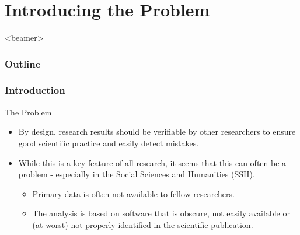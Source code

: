 %
%


\begin{frame}
	\titlepage
\end{frame}

%
%


%
%

%
%
\section[p.one]{Introducing the Problem}
{%
\begin{frame}<beamer>
    \frametitle{Outline}
\tableofcontents[currentsection]
\end{frame}
}

	\begin{frame}
		\frametitle{Introduction}
		\begin{block}{The Problem}
			\begin{itemize}
				\item By design, research results should be verifiable by other researchers to ensure good scientific practice and easily detect mistakes.
				\pause
				\item While this is a key feature of all research, it seems that this can often be a problem - especially in the Social Sciences and Humanities (SSH).
				\pause
				\begin{itemize}
					\item Primary data is often not available to fellow researchers.
					\pause
					\item The analysis is based on software that is obscure, not easily available or (at worst) not properly identified in the scientific publication.
				\end{itemize}
		   \end{itemize}
	   \end{block}
	\end{frame}

